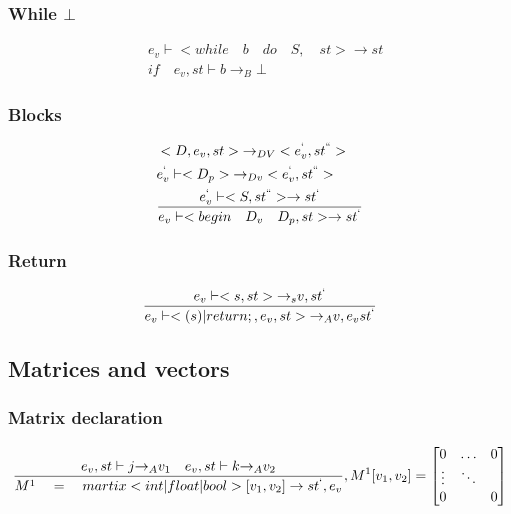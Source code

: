 \subsubsection{While $\bot$}
\begin{align*}
	&{ e }_{ v }\vdash <while\quad b\quad do\quad S,\quad st>\rightarrow st\\
	&if\quad { e }_{ v },st\vdash b{ \rightarrow  }_{ B }\bot
\end{align*}

\subsubsection{Blocks}
\begin{align*}
&<D,{ e }_{ v },st>{ \rightarrow  }_{ DV }<{ e }_{ v }^{ ` },{ st }^{ `` }>\\
&{ e }_{ v }^{ ` }\vdash <{ D }_{ p }>{ \rightarrow  }_{ Dv }<{ e }_{ v }^{ ` },{ st }^{ `` }>\\
&\frac { { e }_{ v }^{ ` }\vdash <S,{ st }^{ `` }>\rightarrow { st }^{ ` } }{ { e }_{ v }\vdash <begin\quad { D }_{ v }\quad { D }_{ p },st>\rightarrow { st }^{ ` } } 
\end{align*}

\subsubsection{Return}
\begin{equation}
	\frac { { e }_{ v }\vdash <{ s },st>{ \rightarrow  }_{ s }v,{ st }^{ ` } }{ { e }_{ v }\vdash <(s)|return;,{ e }_{ v },st>{ \rightarrow  }_{ A }v,{ e }_{ v }{ st }^{ ` } } 
\end{equation}


\subsection*{Matrices and vectors}
\subsubsection{Matrix declaration}
\begin{equation}
	\frac { { e }_{ v },st\vdash j{ \rightarrow  }_{ A }{ v }_{ 1 }\quad { e }_{ v },st\vdash k{ \rightarrow  }_{ A }{ v }_{ 2 } }{ { M }^{ 1 }\quad =\quad martix<int|float|bool>[{ v }_{ 1 },{ v }_{ 2 }]\rightarrow { st }^{ ` },{ e }_{ v } } ,{ M }^{ 1 }[{ v }_{ 1 },{ v }_{ 2 }]=\begin{bmatrix} { 0 } & \dots  & 0 \\ \vdots  & \ddots  &  \\ 0 &  & 0 \end{bmatrix}
\end{equation}

